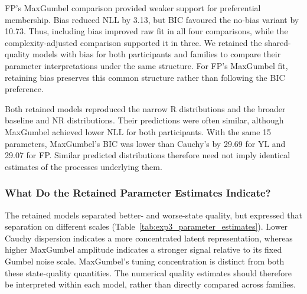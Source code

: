FP's MaxGumbel comparison provided weaker support for preferential membership. Bias reduced NLL by 3.13, but BIC favoured the no-bias variant by 10.73. Thus, including bias improved raw fit in all four comparisons, while the complexity-adjusted comparison supported it in three. We retained the shared-quality models with bias for both participants and families to compare their parameter interpretations under the same structure. For FP's MaxGumbel fit, retaining bias preserves this common structure rather than following the BIC preference.

Both retained models reproduced the narrow R distributions and the broader baseline and NR distributions. Their predictions were often similar, although MaxGumbel achieved lower NLL for both participants. With the same 15 parameters, MaxGumbel's BIC was lower than Cauchy's by 29.69 for YL and 29.07 for FP. Similar predicted distributions therefore need not imply identical estimates of the processes underlying them.


\subsubsection{What Do the Retained Parameter Estimates Indicate?}

The retained models separated better- and worse-state quality, but expressed that separation on different scales (Table~\ref{tab:exp3_parameter_estimates}). Lower Cauchy dispersion indicates a more concentrated latent representation, whereas higher MaxGumbel amplitude indicates a stronger signal relative to its fixed Gumbel noise scale. MaxGumbel's tuning concentration is distinct from both these state-quality quantities. The numerical quality estimates should therefore be interpreted within each model, rather than directly compared across families.

